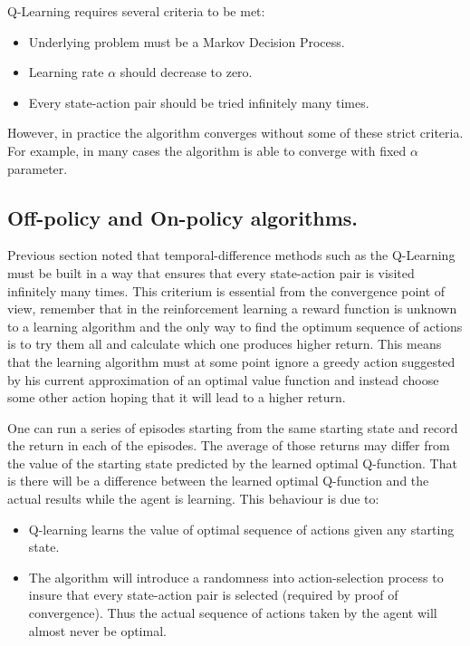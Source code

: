 Q-Learning requires several criteria to be met:
\begin{itemize}
  \item Underlying problem must be a Markov Decision Process.
  \item Learning rate $ \alpha $ should decrease to zero.
  \item Every state-action pair should be tried infinitely many times.
\end{itemize}
However, in practice the algorithm converges without some of these strict criteria. For example, in many cases the algorithm is able to converge with fixed $ \alpha $ parameter.

\subsection{Off-policy and On-policy algorithms.}
Previous section noted that temporal-difference methods such as the Q-Learning must be built in a way that ensures that every state-action pair is visited infinitely many times. This criterium is essential from the convergence point of view, remember that in the reinforcement learning a reward function is unknown to a learning algorithm and the only way to find the optimum sequence of actions is to try them all and calculate which one produces higher return. This means that the learning algorithm must at some point ignore a greedy action suggested by his current approximation of an optimal value function and instead choose some other action hoping that it will lead to a higher return.

One can run a series of episodes starting from the same starting state and record the return in each of the episodes. The average of those returns may differ from the value of the starting state predicted by the learned optimal Q-function. That is there will be a difference between the learned optimal Q-function and the actual results while the agent is learning. This behaviour is due to:
\begin{itemize}
  \item Q-learning learns the value of optimal sequence of actions given any starting state.
  \item The algorithm will introduce a randomness into action-selection process to insure that every state-action pair is selected (required by proof of convergence). Thus the actual sequence of actions taken by the agent will almost never be optimal.
\end{itemize}

